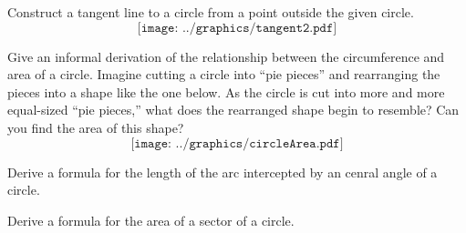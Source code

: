 \begin{prob}
Construct a tangent line to a circle from a point outside the given circle.
$$\texttt{[image: ../graphics/tangent2.pdf]}$$
\end{prob}

\begin{prob}
Give an informal derivation of the relationship between the circumference and area of a circle.  Imagine cutting a circle into ``pie pieces'' and rearranging the pieces into a shape like the one below.  As the circle is cut into more and more equal-sized ``pie pieces,'' what does the rearranged shape begin to resemble?  Can you find the area of this shape?  
$$\texttt{[image: ../graphics/circleArea.pdf]}$$
\end{prob}

\begin{prob}
Derive a formula for the length of the arc intercepted by an cenral angle of a circle.  
\end{prob}

\begin{prob}
Derive a formula for the area of a sector of a circle.  
\end{prob}







